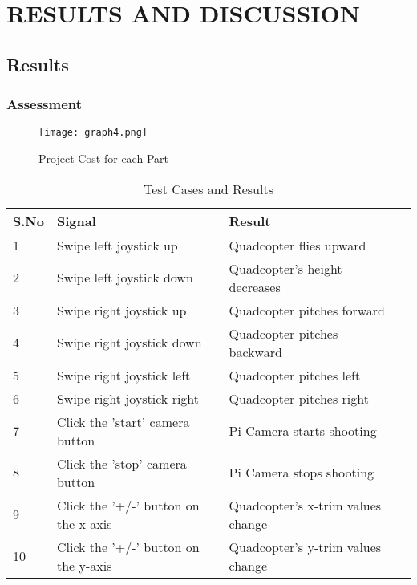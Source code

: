 
\chapter{RESULTS AND DISCUSSION} %

\section{Results}
\subsection{Assessment}


\begin{figure}[H]
  \centering
  \texttt{[image: graph4.png]}
  \caption{Project Cost for each Part}
  \label{Cost wise Estimate}	
\end{figure}

\begin{table}[H]
    \begin{tabular}{ | l | l | l | p{1cm}|}
    \hline
    S.No & Signal & Result \\ \hline
    1 & Swipe left joystick up & Quadcopter flies upward \\ \hline
    2 & Swipe left joystick down &  Quadcopter's height decreases \\ \hline
    3 & Swipe right joystick up & Quadcopter pitches forward \\ \hline
    4 & Swipe right joystick down & Quadcopter pitches backward \\ \hline
 5 & Swipe right joystick left & Quadcopter pitches left \\ \hline
 6 & Swipe right joystick right & Quadcopter pitches right \\ \hline
 7 & Click the 'start' camera button & Pi Camera starts shooting \\ \hline
 8 & Click the 'stop' camera button & Pi Camera stops shooting \\ \hline
 9 & Click the '+/-' button on the x-axis & Quadcopter's x-trim values change \\ \hline
 10 & Click the '+/-' button on the y-axis & Quadcopter's y-trim values change \\ \hline
\end{tabular}
\caption{Test Cases and Results}
\label{APT}
\end{table}

